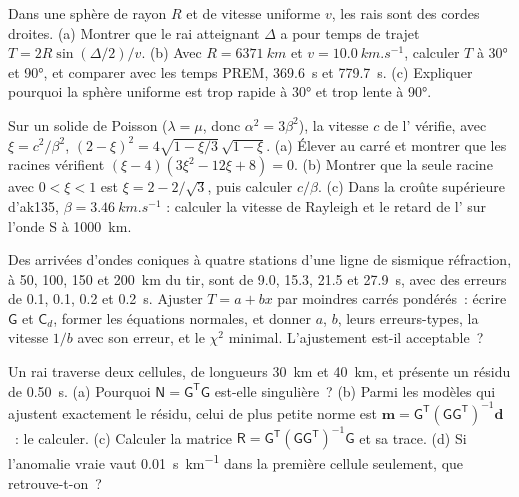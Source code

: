 \begin{exercise}[$\star\star$]\label{exo:b3:seismology-imaging:5}
Dans une sphère de rayon $R$ et de vitesse uniforme $v$, les rais sont des cordes droites.
(a) Montrer que le rai atteignant $\Delta$ a pour temps de trajet
$T = 2R\sin(\Delta/2)/v$. (b) Avec $R = \qty{6371}{km}$ et
$v = \qty{10.0}{km.s^{-1}}$, calculer $T$ à \ang{30} et \ang{90}, et comparer
avec les temps PREM, \qty{369.6}{s} et \qty{779.7}{s}. (c) Expliquer pourquoi la
sphère uniforme est trop rapide à \ang{30} et trop lente à \ang{90}.
\end{exercise}

\begin{exercise}[$\star\star$]\label{exo:b3:seismology-imaging:6}
Sur un solide de Poisson ($\lambda = \mu$, donc $\alpha^2 = 3\beta^2$), la vitesse $c$
de l' vérifie, avec $\xi = c^2/\beta^2$,
$(2 - \xi)^2 = 4\sqrt{1 - \xi/3}\,\sqrt{1 - \xi}$. (a) Élever au carré et montrer
que les racines vérifient $(\xi - 4)(3\xi^2 - 12\xi + 8) = 0$. (b) Montrer que la
seule racine avec $0 < \xi < 1$ est $\xi = 2 - 2/\sqrt3$, puis calculer $c/\beta$.
(c) Dans la croûte supérieure d'ak135, $\beta = \qty{3.46}{km.s^{-1}}$ : calculer la
vitesse de Rayleigh et le retard de l' sur l'onde S à
\qty{1000}{km}.
\end{exercise}

\begin{exercise}[$\star\star$]\label{exo:b3:seismology-imaging:7}
Des arrivées d'ondes coniques à quatre stations d'une ligne de sismique réfraction, à 50, 100, 150 et
\qty{200}{km} du tir, sont de 9.0, 15.3, 21.5 et \qty{27.9}{s}, avec
des erreurs de 0.1, 0.1, 0.2 et \qty{0.2}{s}. Ajuster $T = a + bx$ par moindres carrés pondérés~:
écrire $\mathsf G$ et $\mathsf C_d$, former les équations normales, et
donner $a$, $b$, leurs erreurs-types, la vitesse $1/b$ avec son erreur, et le
$\chi^2$ minimal. L'ajustement est-il acceptable~?
\end{exercise}

\begin{exercise}[$\star\star$]\label{exo:b3:seismology-imaging:8}
Un rai traverse deux cellules, de longueurs \qty{30}{km} et \qty{40}{km}, et présente
un résidu de \qty{0.50}{s}. (a) Pourquoi $\mathsf N = \mathsf G^{\mathsf T}
\mathsf G$ est-elle singulière~? (b) Parmi les modèles qui ajustent exactement le résidu, celui
de plus petite norme est $\mathbf m = \mathsf G^{\mathsf T}(\mathsf G\mathsf
G^{\mathsf T})^{-1}\mathbf d$~: le calculer. (c) Calculer la matrice
$\mathsf R = \mathsf G^{\mathsf T}(\mathsf G\mathsf G^{\mathsf T})^{-1}\mathsf G$
et sa trace. (d) Si l'anomalie vraie vaut \qty{0.01}{s.km^{-1}} dans la première
cellule seulement, que retrouve-t-on~?
\end{exercise}

